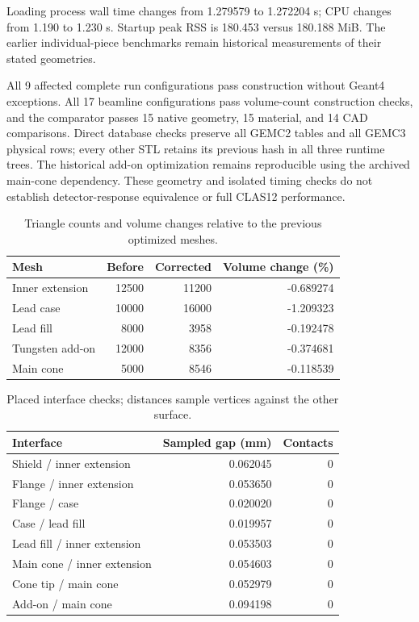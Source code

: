 Loading process wall time changes from 1.279579 to 1.272204 s; CPU changes from 1.190 to 1.230 s. Startup peak
RSS is 180.453 versus 180.188 MiB. The earlier individual-piece benchmarks remain historical measurements of
their stated geometries.

All 9 affected complete run configurations pass construction without Geant4 exceptions. All 17 beamline
configurations pass volume-count construction checks, and the comparator passes 15 native geometry, 15
material, and 14 CAD comparisons. Direct database checks preserve all GEMC2 tables and all GEMC3 physical
rows; every other STL retains its previous hash in all three runtime trees. The historical add-on optimization
remains reproducible using the archived main-cone dependency. These geometry and isolated timing checks do not
establish detector-response equivalence or full CLAS12 performance.

\begin{table}[htbp]
\centering
\caption{Triangle counts and volume changes relative to the previous optimized meshes.}
\label{tab:ft-joints-meshes}
\setlength{\tabcolsep}{5pt}
\begin{tabular}{lrrr}
\toprule
Mesh & Before & Corrected & Volume change (\%) \\
\midrule
Inner extension & 12500 & 11200 & -0.689274 \\
Lead case & 10000 & 16000 & -1.209323 \\
Lead fill & 8000 & 3958 & -0.192478 \\
Tungsten add-on & 12000 & 8356 & -0.374681 \\
Main cone & 5000 & 8546 & -0.118539 \\
\bottomrule
\end{tabular}
\end{table}

\begin{table}[htbp]
\centering
\caption{Placed interface checks; distances sample vertices against the other surface.}
\label{tab:ft-joints-gaps}
\setlength{\tabcolsep}{5pt}
\begin{tabular}{lrr}
\toprule
Interface & Sampled gap (mm) & Contacts \\
\midrule
Shield / inner extension & 0.062045 & 0 \\
Flange / inner extension & 0.053650 & 0 \\
Flange / case & 0.020020 & 0 \\
Case / lead fill & 0.019957 & 0 \\
Lead fill / inner extension & 0.053503 & 0 \\
Main cone / inner extension & 0.054603 & 0 \\
Cone tip / main cone & 0.052979 & 0 \\
Add-on / main cone & 0.094198 & 0 \\
\bottomrule
\end{tabular}
\end{table}

